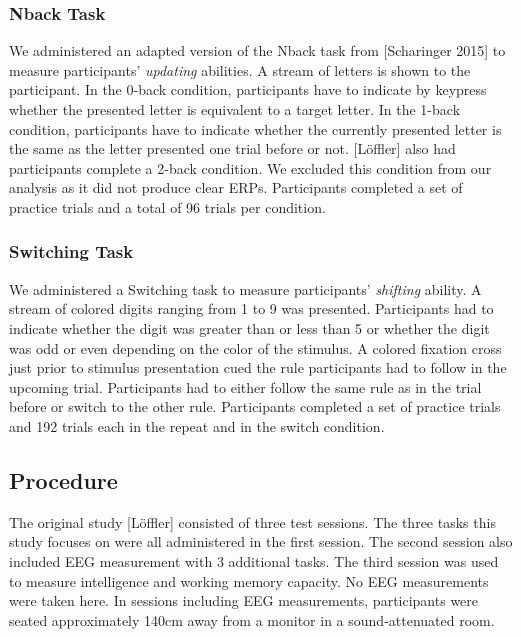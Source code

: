 \documentclass[
  man,floatsintext]{apa7}
\begin{document}
\hypertarget{nback-task}{%
\subsubsection{Nback Task}\label{nback-task}}

We administered an adapted version of the Nback task from {[}Scharinger 2015{]} to measure participants' \emph{updating} abilities. A stream of letters is shown to the participant. In the 0-back condition, participants have to indicate by keypress whether the presented letter is equivalent to a target letter. In the 1-back condition, participants have to indicate whether the currently presented letter is the same as the letter presented one trial before or not. {[}Löffler{]} also had participants complete a 2-back condition. We excluded this condition from our analysis as it did not produce clear ERPs. Participants completed a set of practice trials and a total of 96 trials per condition.

\hypertarget{switching-task}{%
\subsubsection{Switching Task}\label{switching-task}}

We administered a Switching task to measure participants' \emph{shifting} ability. A stream of colored digits ranging from 1 to 9 was presented. Participants had to indicate whether the digit was greater than or less than 5 or whether the digit was odd or even depending on the color of the stimulus. A colored fixation cross just prior to stimulus presentation cued the rule participants had to follow in the upcoming trial. Participants had to either follow the same rule as in the trial before or switch to the other rule. Participants completed a set of practice trials and 192 trials each in the repeat and in the switch condition.

\hypertarget{procedure}{%
\subsection{Procedure}\label{procedure}}

The original study {[}Löffler{]} consisted of three test sessions. The three tasks this study focuses on were all administered in the first session. The second session also included EEG measurement with 3 additional tasks. The third session was used to measure intelligence and working memory capacity. No EEG measurements were taken here. In sessions including EEG measurements, participants were seated approximately 140cm away from a monitor in a sound-attenuated room.
\end{document}
